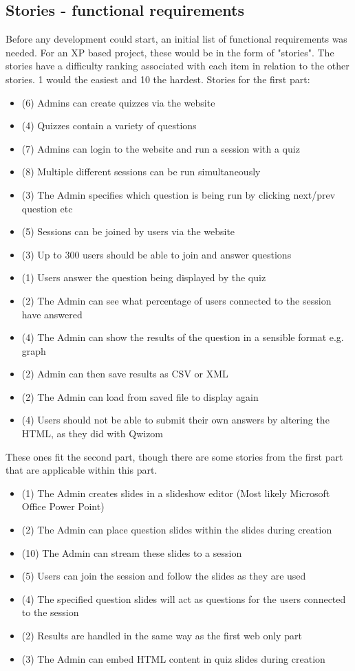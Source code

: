 \subsection{Stories - functional requirements}
Before any development could start, an initial list of functional requirements was needed. For an XP based project, these would be in the form of "stories". The stories have a difficulty ranking associated with each item in relation to the other stories. 1 would the easiest and 10 the hardest.
Stories for the first part:
\begin{itemize}
	\item (6) Admins can create quizzes via the website
	\item (4) Quizzes contain a variety of questions
	\item (7) Admins can login to the website and run a session with a quiz
	\item (8) Multiple different sessions can be run simultaneously
	\item (3) The Admin specifies which question is being run by clicking next/prev question etc
	\item (5) Sessions can be joined by users via the website
	\item (3) Up to 300 users should be able to join and answer questions
	\item (1) Users answer the question being displayed by the quiz
	\item (2) The Admin can see what percentage of users connected to the session have answered
	\item (4) The Admin can show the results of the question in a sensible format e.g. graph
	\item (2) Admin can then save results as CSV or XML
	\item (2) The Admin can load from saved file to display again
	\item (4) Users should not be able to submit their own answers by altering the HTML, as they did with Qwizom
\end{itemize}
These ones fit the second part, though there are some stories from the first part that are applicable within this part.
\begin{itemize}
	\item (1) The Admin creates slides in a slideshow editor (Most likely Microsoft Office Power Point)
	\item (2) The Admin can place question slides within the slides during creation
	\item (10) The Admin can stream these slides to a session
	\item (5) Users can join the session and follow the slides as they are used	
	\item (4) The specified question slides will act as questions for the users connected to the session
	\item (2) Results are handled in the same way as the first web only part
	\item (3) The Admin can embed HTML content in quiz slides during creation
\end{itemize}

